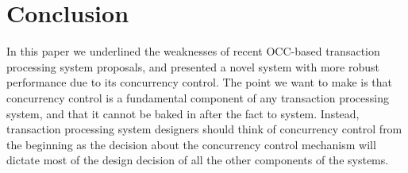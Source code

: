 
\section{Conclusion}

In this paper we underlined the weaknesses of recent OCC-based transaction processing system proposals, and presented a novel system with more robust performance due to its concurrency control.
The point we want to make is that concurrency control is a fundamental component of any transaction processing system, and that it cannot be baked in after the fact to system. Instead, transaction processing system designers should think of concurrency control from the beginning as the decision about the concurrency control mechanism will dictate most of the design decision of all the other components of the systems. 
